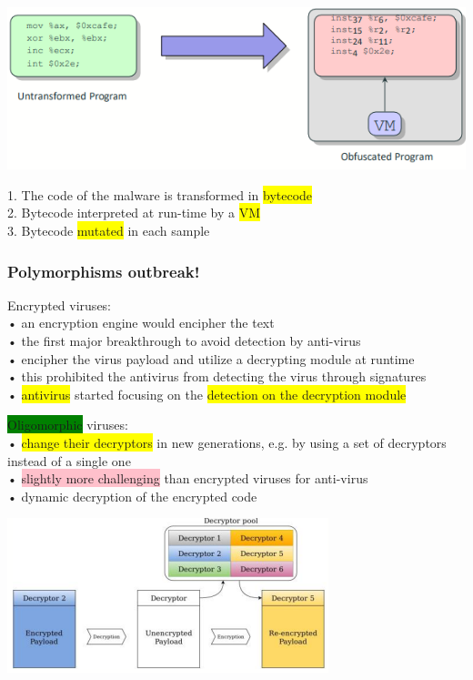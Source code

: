 \documentclass[]{project_plan}
\begin{document}
\includegraphics[width=.8\linewidth]{self-emulating malware.png}

1. The code of the malware is transformed in \colorbox{yellow}{bytecode}\\
2. Bytecode interpreted at run-time by a \colorbox{yellow}{VM}\\
3. Bytecode \colorbox{yellow}{mutated} in each sample

\subsubsection{Polymorphisms outbreak!}

Encrypted viruses:\\
• an encryption engine would encipher the text\\
• the first major breakthrough to avoid detection by anti-virus\\
• encipher the virus payload and utilize a decrypting module at runtime\\
• this prohibited the antivirus from detecting the virus through signatures\\
• \colorbox{yellow}{antivirus} started focusing on the \colorbox{yellow}{detection on the decryption module}

\colorbox{green}{Oligomorphic} viruses:\\
• \colorbox{yellow}{change their decryptors} in new generations, e.g. by using a set of decryptors instead of a single one\\
• \colorbox{pink}{slightly more challenging} than encrypted viruses for anti-virus\\
• dynamic decryption of the encrypted code

\includegraphics[width=.8\linewidth]{Oligomorphism.png}
\end{document}
